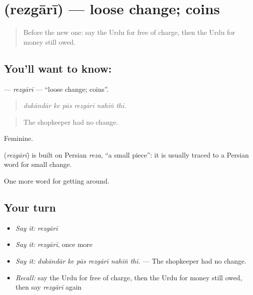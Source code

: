 \section[\texorpdfstring{\ur{ریزگاری} (rezgārī)}{ریزگاری (rezgārī)}]{ (rezgārī) — loose change; coins}

\label{lesson:UR-C425-rezgari}



\begin{quote}
Before the new one: say the Urdu for free of charge, then the Urdu for money still owed.
\end{quote}

\subsection*{You'll want to know: }
\textbf{} — \emph{rezgārī} — \textquotedblleft{}loose change; coins\textquotedblright{}.

\begin{quote}
     
\end{quote}

\begin{quote}
\emph{dukāndār ke pās rezgārī nahīṅ thī.}
\end{quote}

\begin{quote}
The shopkeeper had no change.
\end{quote}

Feminine.

\begin{cousinweb}
\textbf{} (\emph{rezgārī}) is built on Persian \emph{reza}, \textquotedblleft{}a small piece\textquotedblright{}: it is usually traced to a Persian word for small change.
\end{cousinweb}

\begin{grammarlens}[title={What you've built}]
One more word for getting around.
\end{grammarlens}

\subsection*{Your turn}
\begin{itemize}
\raggedright
  \item \emph{Say it:} \emph{rezgārī}
  \item \emph{Say it:} \emph{rezgārī}, once more
  \item \emph{Say it:} \emph{dukāndār ke pās rezgārī nahīṅ thī.} — The shopkeeper had no change.
  \item \emph{Recall:} say the Urdu for free of charge, then the Urdu for money still owed, then say \emph{rezgārī} again
\end{itemize}

